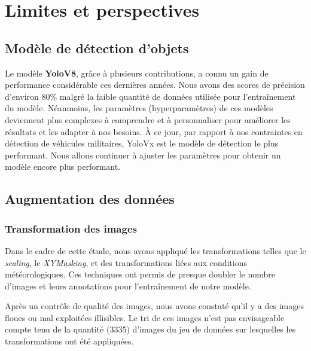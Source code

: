 \section{Limites et perspectives}
\subsection{Modèle de détection d'objets}

Le modèle  \textbf{YoloV8}, grâce à plusieurs contributions, a connu un gain de performance considérable ces dernières années.
Nous avons des scores de précision d'environ 80\% malgré la faible quantité de données utilisée pour l'entraînement du modèle.
Néanmoins, les paramètres (hyperparamètres) de ces modèles deviennent plus complexes à comprendre et à personnaliser pour améliorer les résultats et les adapter à nos besoins.
À ce jour, par rapport à nos contraintes en détection de véhicules militaires, YoloVx est le modèle de détection le plus performant.
Nous allons continuer à ajuster les paramètres pour obtenir un modèle encore plus performant.

\subsection{Augmentation des données}
\subsubsection{Transformation des images}
\label{trando_image}
Dans le cadre de cette étude, nous avons appliqué les transformations telles que le \textit{scaling}, le \textit{XYMasking}, et des transformations liées aux conditions météorologiques.
Ces techniques ont permis de presque doubler le nombre d'images et leurs annotations pour l'entraînement de notre modèle.

Après un contrôle de qualité des images, nous avons constaté qu'il y a des images floues ou mal exploitées illisibles.
Le tri de ces images n'est pas envisageable compte tenu de la quantité (3335) d'images du jeu de données sur lesquelles les transformations ont été appliquées.

